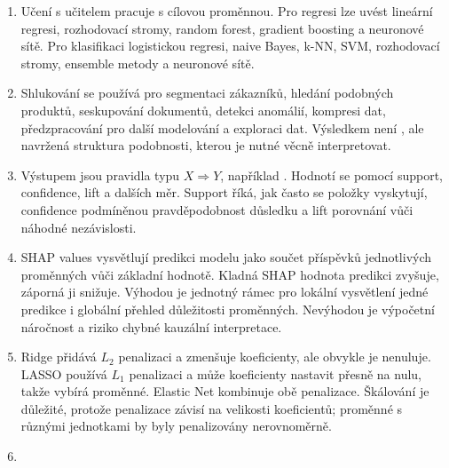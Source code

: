 \documentclass[12pt,a4paper]{article}
\begin{document}
\begin{enumerate}
  \item {}

  Učení s učitelem pracuje s cílovou proměnnou. Pro regresi lze uvést lineární regresi, rozhodovací
  stromy, random forest, gradient boosting a neuronové sítě. Pro klasifikaci logistickou regresi,
  naive Bayes, k-NN, SVM, rozhodovací stromy, ensemble metody a neuronové sítě.

  \item {}

  Shlukování se používá pro segmentaci zákazníků, hledání podobných produktů, seskupování dokumentů,
  detekci anomálií, kompresi dat, předzpracování pro další modelování a exploraci dat. Výsledkem
  není , ale navržená struktura podobnosti, kterou je nutné věcně interpretovat.

  \item {}

  Výstupem jsou pravidla typu \(X \Rightarrow Y\), například .
  Hodnotí se pomocí support, confidence, lift a dalších měr. Support říká, jak často se položky
  vyskytují, confidence podmíněnou pravděpodobnost důsledku a lift porovnání vůči náhodné nezávislosti.

  \item {}

  SHAP values vysvětlují predikci modelu jako součet příspěvků jednotlivých proměnných vůči základní
  hodnotě. Kladná SHAP hodnota predikci zvyšuje, záporná ji snižuje. Výhodou je jednotný rámec pro
  lokální vysvětlení jedné predikce i globální přehled důležitosti proměnných. Nevýhodou je výpočetní
  náročnost a riziko chybné kauzální interpretace.

  \item {}

  Ridge přidává \(L_2\) penalizaci a zmenšuje koeficienty, ale obvykle je nenuluje. LASSO používá
  \(L_1\) penalizaci a může koeficienty nastavit přesně na nulu, takže vybírá proměnné. Elastic Net
  kombinuje obě penalizace. Škálování je důležité, protože penalizace závisí na velikosti koeficientů;
  proměnné s různými jednotkami by byly penalizovány nerovnoměrně.

  \item {}


\end{enumerate}
\end{document}
